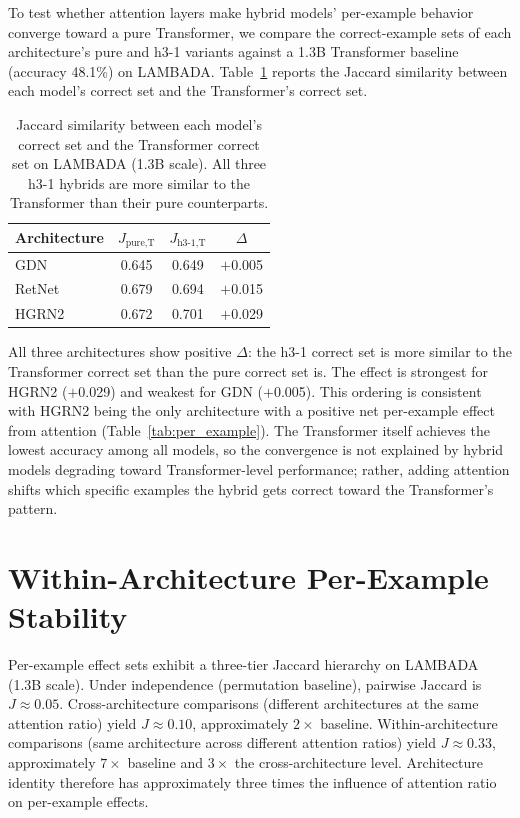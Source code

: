 To test whether attention layers make hybrid models' per-example behavior converge toward a pure Transformer, we compare the correct-example sets of each architecture's pure and h3-1 variants against a 1.3B Transformer baseline (accuracy 48.1\%) on LAMBADA. Table~\ref{tab:transformer_jaccard} reports the Jaccard similarity between each model's correct set and the Transformer's correct set.

\begin{table}[ht]
\centering
\caption{Jaccard similarity between each model's correct set and the Transformer correct set on LAMBADA (1.3B scale). All three h3-1 hybrids are more similar to the Transformer than their pure counterparts.}
\label{tab:transformer_jaccard}
\small
\begin{tabular}{lccc}
\toprule
Architecture & $J_{\text{pure,T}}$ & $J_{\text{h3-1,T}}$ & $\Delta$ \\
\midrule
GDN & 0.645 & 0.649 & $+$0.005 \\
RetNet & 0.679 & 0.694 & $+$0.015 \\
HGRN2 & 0.672 & 0.701 & $+$0.029 \\
\bottomrule
\end{tabular}
\end{table}

All three architectures show positive $\Delta$: the h3-1 correct set is more similar to the Transformer correct set than the pure correct set is. The effect is strongest for HGRN2 ($+$0.029) and weakest for GDN ($+$0.005). This ordering is consistent with HGRN2 being the only architecture with a positive net per-example effect from attention (Table~\ref{tab:per_example}). The Transformer itself achieves the lowest accuracy among all models, so the convergence is not explained by hybrid models degrading toward Transformer-level performance; rather, adding attention shifts which specific examples the hybrid gets correct toward the Transformer's pattern.

\section{Within-Architecture Per-Example Stability}\label{app:within_arch_stability}

Per-example effect sets exhibit a three-tier Jaccard hierarchy on LAMBADA (1.3B scale). Under independence (permutation baseline), pairwise Jaccard is $J \approx 0.05$. Cross-architecture comparisons (different architectures at the same attention ratio) yield $J \approx 0.10$, approximately $2\times$ baseline. Within-architecture comparisons (same architecture across different attention ratios) yield $J \approx 0.33$, approximately $7\times$ baseline and $3\times$ the cross-architecture level. Architecture identity therefore has approximately three times the influence of attention ratio on per-example effects.


